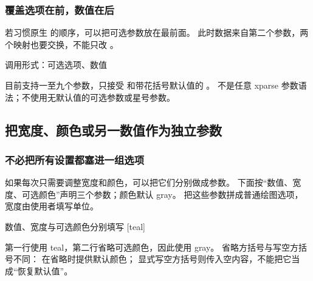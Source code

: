 \subsubsection{覆盖选项在前，数值在后}
若习惯原生  的顺序，可以把可选参数放在最前面。
此时数据来自第二个参数，两个映射也要交换，不能只改 。
\begin{example}[text and listing,sidebyside=false]{调用形式：可选选项、数值}
\begingroup
\gradbarsnewcommand[
  args={O{} m},data={#2},options={#1},
  max=1,width=25mm,precision=3,theme=gray
]{\beforebar}
\qquad{}
\endgroup
\end{example}
目前支持一至九个参数，只接受  和带花括号默认值的 。
不是任意 xparse 参数语法；不使用无默认值的可选参数或星号参数。

\subsection{把宽度、颜色或另一数值作为独立参数}
\label{sec:command-data-cn}
\subsubsection{不必把所有设置都塞进一组选项}
如果每次只需要调整宽度和颜色，可以把它们分别做成参数。
下面按“数值、宽度、可选颜色”声明三个参数；颜色默认 gray。
 把这些参数拼成普通绘图选项，宽度由使用者填写单位。
\begin{example}[text and listing,sidebyside=false]{数值、宽度与可选颜色分别填写}
\begingroup
\gradbarsnewcommand[
  type=bar,args={m m O{gray}},data={#1},
  options={width=#2,color=#3},
  min=0,max=1,height=5pt,precision=3,
  label position=right,label distance=1mm
]{\sizedbar}
[teal]\par\medskip
{}
\endgroup
\end{example}
第一行使用 teal，第二行省略可选颜色，因此使用 gray。
省略方括号与写空方括号不同： 在省略时提供默认颜色；
显式写空方括号则传入空内容，不能把它当成“恢复默认值”。

